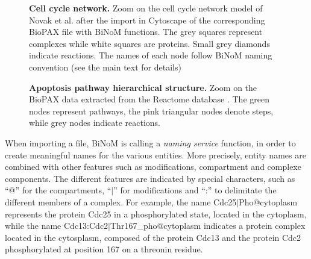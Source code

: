 \documentclass[10pt]{bmc_article}
\newenvironment{bmcformat}{\baselineskip20pt\sloppy\setboolean{publ}{false}}{\baselineskip20pt\sloppy}
\begin{document}
\begin{bmcformat}
\begin{figure}[h]
 \caption{\label{mphasebiopax}  \textbf{Cell cycle network.} Zoom on the cell
cycle network model of Novak et al. \cite{novak1998model} after the import in 
Cytoscape of the corresponding BioPAX file with BiNoM functions. The grey
squares represent complexes while white squares are proteins. Small grey diamonds
indicate reactions. The names of each node follow BiNoM naming convention (see the main text for details)}
\end{figure}

\begin{figure}[h]
 \caption{\label{apoptosishierarchical}  \textbf{Apoptosis pathway hierarchical
structure.} Zoom on the BioPAX data extracted from the Reactome database
\cite{joshi2005reactome}. The green nodes represent pathways, the pink
triangular nodes denote steps, while grey nodes indicate reactions.}
\end{figure}


When importing a file, BiNoM is calling a \emph{naming service} function, in
order to create meaningful names for the various entities. More precisely,
entity names are combined with other features such as modifications, compartment
and complexe components. The different features are indicated by special
characters, such as ``@'' for the compartments, ``$|$'' for modifications and
``:'' to delimitate the different members of a complex. For example, the
name Cdc25$|$Pho@cytoplasm represents the protein Cdc25 in a phosphorylated
state, located in the cytoplasm, while the name
Cdc13:Cdc2$|$Thr167\_pho@cytoplasm indicates a protein complex located in the
cytosplasm, composed of the protein Cdc13 and the protein Cdc2 phosphorylated at
position 167 on a threonin residue.



\end{bmcformat}
\end{document}
